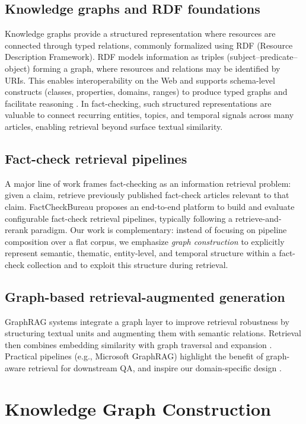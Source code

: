 \documentclass[10pt]{article}
\begin{document}
\subsection{Knowledge graphs and RDF foundations}
Knowledge graphs provide a structured representation where resources are connected through typed relations, commonly formalized using RDF (Resource Description Framework). RDF models information as triples (subject--predicate--object) forming a graph, where resources and relations may be identified by URIs. This enables interoperability on the Web and supports schema-level constructs (classes, properties, domains, ranges) to produce typed graphs and facilitate reasoning \cite{manolescuRDFintro}. In fact-checking, such structured representations are valuable to connect recurring entities, topics, and temporal signals across many articles, enabling retrieval beyond surface textual similarity.

\subsection{Fact-check retrieval pipelines}
A major line of work frames fact-checking as an information retrieval problem: given a claim, retrieve previously published fact-check articles relevant to that claim. FactCheckBureau \cite{balalau2024factcheckbureau} proposes an end-to-end platform to build and evaluate configurable fact-check retrieval pipelines, typically following a retrieve-and-rerank paradigm. Our work is complementary: instead of focusing on pipeline composition over a flat corpus, we emphasize \emph{graph construction} to explicitly represent semantic, thematic, entity-level, and temporal structure within a fact-check collection and to exploit this structure during retrieval.

\subsection{Graph-based retrieval-augmented generation}
GraphRAG systems integrate a graph layer to improve retrieval robustness by structuring textual units and augmenting them with semantic relations. Retrieval then combines embedding similarity with graph traversal and expansion \cite{zhang2025graphrag}. Practical pipelines (e.g., Microsoft GraphRAG) highlight the benefit of graph-aware retrieval for downstream QA, and inspire our domain-specific design \cite{msftgraphrag}.

\section{Knowledge Graph Construction}
\label{sec:kg_construction}
\end{document}
